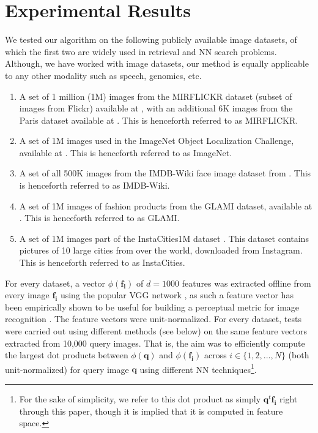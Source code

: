 \documentclass[sigconf, anonymous, review]{acmart}
\begin{document}
\section{Experimental Results}
\label{sec:results}
We tested our algorithm on the following publicly available image datasets, of which the first two are widely used in retrieval and NN search problems. Although, we have worked with image datasets, our method is equally applicable to any other modality such as speech, genomics, etc.
\begin{enumerate}
    \item A set of 1 million (1M) images from the MIRFLICKR dataset (subset of images from Flickr) available at \cite{MIRFLICKR}, with an additional 6K images from the Paris dataset available at \cite{ParisDataset}. This is henceforth referred to as \textsf{MIRFLICKR}.
    \item A set of 1M images used in the ImageNet Object Localization Challenge, available at \cite{ImageNetKaggle}. This is henceforth referred to as \textsf{ImageNet}.  
    \item A set of all 500K images from the IMDB-Wiki face image dataset from \cite{IMDB-Wiki}. This is henceforth referred to as \textsf{IMDB-Wiki}.
    \item A set of 1M images of fashion products from the GLAMI dataset, available at \cite{GLAMI}. This is henceforth referred to as \textsf{GLAMI}. 
    \item A set of 1M images part of the InstaCities1M dataset \cite{InstaCities}. This dataset contains pictures of 10 large cities from over the world, downloaded from Instagram. This is henceforth referred to as \textsf{InstaCities}.
    \end{enumerate}
For every dataset, a vector $\phi(\boldsymbol{f_i})$ of $d = 1000$ features was extracted offline from every image $\boldsymbol{f_i}$ using the popular VGG network \cite{Simonyan2015}, as such a feature vector has been empirically shown to be useful for building a perceptual metric for image recognition \cite{Zhang2018}. The feature vectors were unit-normalized. For every dataset, tests were carried out using different methods (see below) on the same feature vectors extracted from 10,000 query images. That is, the aim was to efficiently compute the largest dot products between $\phi(\boldsymbol{q})$ and $\phi(\boldsymbol{f_i})$ across $i \in \{1,2,...,N\}$ (both unit-normalized) for query image $\boldsymbol{q}$ using different NN techniques\footnote{For the sake of simplicity, we refer to this dot product as simply $\boldsymbol{q}^t\boldsymbol{f_i}$ right through this paper, though it is implied that it is computed in feature space.}. 
\end{document}
